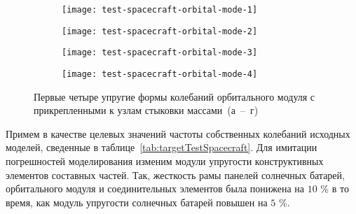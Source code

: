 \def\sfSpacecraft{0.44\textwidth}

\begin{figure}[!htb]
	\centering
	\begin{subfigure}[t]{\sfSpacecraft}
		\centering
		\texttt{[image: test-spacecraft-orbital-mode-1]}
		\caption{} 
	\end{subfigure}
	\hfill
	\begin{subfigure}[t]{\sfSpacecraft}
		\centering
		\texttt{[image: test-spacecraft-orbital-mode-2]}
		\caption{} 
	\end{subfigure}	
	\begin{subfigure}[t]{\sfSpacecraft}
		\centering
		\texttt{[image: test-spacecraft-orbital-mode-3]}
		\caption{} 
	\end{subfigure}	
	\hfill
	\begin{subfigure}[t]{\sfSpacecraft}
		\centering
		\texttt{[image: test-spacecraft-orbital-mode-4]}
		\caption{} 
	\end{subfigure}	
	\caption{Первые четыре упругие формы колебаний орбитального модуля с прикрепленными к узлам стыковки массами~(а~--~г)} \label{fig:test-spacecraft-orbital-mode} 
\end{figure}

Примем в качестве целевых значений частоты собственных колебаний исходных моделей, сведенные в таблице~\ref{tab:targetTestSpacecraft}. Для имитации погрешностей моделирования изменим модули упругости конструктивных элементов составных частей. Так, жесткость рамы панелей солнечных батарей, орбитального модуля и соединительных элементов была понижена на $ 10 $ \% в то время, как модуль упругости солнечных батарей повышен на $ 5 $ \%.


